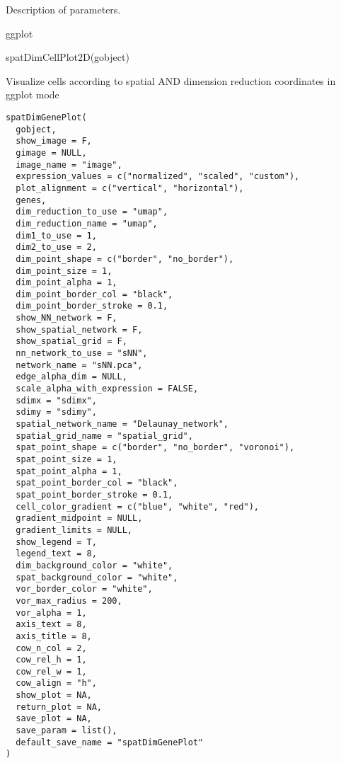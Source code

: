 \documentclass[a4paper]{book}
\begin{document}
%
\begin{Details}\relax
Description of parameters.
\end{Details}
%
\begin{Value}
ggplot
\end{Value}
%
\begin{Examples}
\begin{ExampleCode}
    spatDimCellPlot2D(gobject)
\end{ExampleCode}
\end{Examples}
%
\begin{Description}\relax
Visualize cells according to spatial AND dimension reduction coordinates in ggplot mode
\end{Description}
%
\begin{Usage}
\begin{verbatim}
spatDimGenePlot(
  gobject,
  show_image = F,
  gimage = NULL,
  image_name = "image",
  expression_values = c("normalized", "scaled", "custom"),
  plot_alignment = c("vertical", "horizontal"),
  genes,
  dim_reduction_to_use = "umap",
  dim_reduction_name = "umap",
  dim1_to_use = 1,
  dim2_to_use = 2,
  dim_point_shape = c("border", "no_border"),
  dim_point_size = 1,
  dim_point_alpha = 1,
  dim_point_border_col = "black",
  dim_point_border_stroke = 0.1,
  show_NN_network = F,
  show_spatial_network = F,
  show_spatial_grid = F,
  nn_network_to_use = "sNN",
  network_name = "sNN.pca",
  edge_alpha_dim = NULL,
  scale_alpha_with_expression = FALSE,
  sdimx = "sdimx",
  sdimy = "sdimy",
  spatial_network_name = "Delaunay_network",
  spatial_grid_name = "spatial_grid",
  spat_point_shape = c("border", "no_border", "voronoi"),
  spat_point_size = 1,
  spat_point_alpha = 1,
  spat_point_border_col = "black",
  spat_point_border_stroke = 0.1,
  cell_color_gradient = c("blue", "white", "red"),
  gradient_midpoint = NULL,
  gradient_limits = NULL,
  show_legend = T,
  legend_text = 8,
  dim_background_color = "white",
  spat_background_color = "white",
  vor_border_color = "white",
  vor_max_radius = 200,
  vor_alpha = 1,
  axis_text = 8,
  axis_title = 8,
  cow_n_col = 2,
  cow_rel_h = 1,
  cow_rel_w = 1,
  cow_align = "h",
  show_plot = NA,
  return_plot = NA,
  save_plot = NA,
  save_param = list(),
  default_save_name = "spatDimGenePlot"
)
\end{verbatim}
\end{Usage}
%
\end{document}
